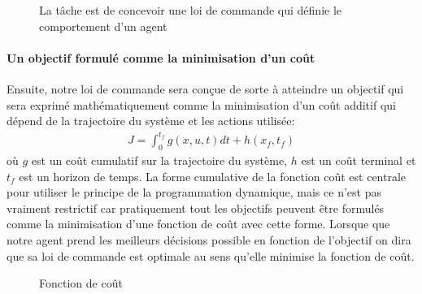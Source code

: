 \begin{figure}[H]
	\centering
	\vspace{-10pt}
		\caption{La tâche est de concevoir une loi de commande qui définie le comportement d'un agent}
		\label{fig:agent}
\end{figure}

\paragraph{Un objectif formulé comme la minimisation d'un coût}
Ensuite, notre loi de commande sera conçue de sorte à atteindre un objectif qui sera exprimé mathématiquement comme la minimisation d'un coût additif qui dépend de la trajectoire du système et les actions utilisée:
\begin{align}
    J=\int_0^{t_f}g(x,u,t) dt + h(x_f,t_f)
\end{align}
où $g$ est un coût cumulatif sur la trajectoire du système, $h$ est un coût terminal et $t_f$ est un horizon de temps. La forme cumulative de la fonction coût est centrale pour utiliser le principe de la programmation dynamique, mais ce n'est pas vraiment restrictif car pratiquement tout les objectifs peuvent être formulés comme la minimisation d'une fonction de coût avec cette forme. Lorsque que notre agent prend les meilleurs décisions possible en fonction de l'objectif on dira que sa loi de commande est optimale au sens qu'elle minimise la fonction de coût. 

\begin{figure}[H]
	\centering
	\vspace{-10pt}
		\caption{Fonction de coût}
		\label{fig:cost}
\end{figure}




